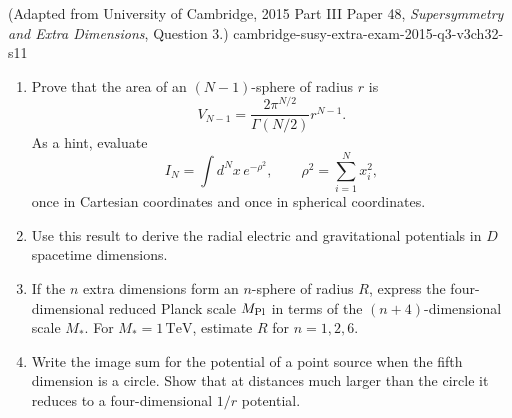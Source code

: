 \begin{enumerate}
    {(Adapted from University of Cambridge, 2015 Part III Paper 48,
      \emph{Supersymmetry and Extra Dimensions}, Question 3.)}
    {cambridge-susy-extra-exam-2015-q3-v3ch32-s11}
  \begin{enumerate}
    \item Prove that the area of an \((N-1)\)-sphere of radius \(r\) is
      \[
        V_{N-1}=\frac{2\pi^{N/2}}{\Gamma(N/2)}r^{N-1}.
      \]
      As a hint, evaluate
      \[
        I_N=\int d^Nx\,e^{-\rho^2},
        \qquad \rho^2=\sum_{i=1}^N x_i^2,
      \]
      once in Cartesian coordinates and once in spherical coordinates.
    \item Use this result to derive the radial electric and gravitational
      potentials in \(D\) spacetime dimensions.
    \item If the \(n\) extra dimensions form an \(n\)-sphere of radius
      \(R\), express the four-dimensional reduced Planck scale
      \(M_{\rm Pl}\) in terms of the \((n+4)\)-dimensional scale \(M_*\).
      For \(M_*=1\,\mathrm{TeV}\), estimate \(R\) for
      \(n=1,2,6\).
    \item Write the image sum for the potential of a point source when the
      fifth dimension is a circle.  Show that at distances much larger than
      the circle it reduces to a four-dimensional \(1/r\) potential.
  \end{enumerate}


\end{enumerate}
